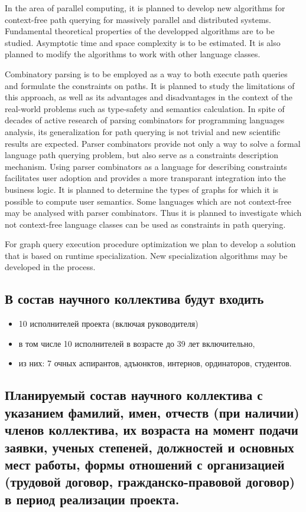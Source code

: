 \documentclass[12pt]{article}  %
\theoremstyle{remark}
\begin{document}
In the area of parallel computing, it is planned to develop new algorithms for context-free path querying for massively parallel and distributed systems.
Fundamental theoretical properties of the developped algorithms are to be studied.
Asymptotic time and space complexity is to be estimated.
It is also planned to modify the algorithms to work with other language classes.

Combinatory parsing is to be employed as a way to both execute path queries and formulate the constraints on paths.
It is planned to study the limitations of this approach, as well as its advantages and disadvantages in the context of the real-world problems such as type-safety and semantics calculation.
In spite of decades of active research of parsing combinators for programming languages analysis, its generalization for path querying is not trivial and new scientific results are expected.
Parser combinators provide not only a way to solve a formal language path querying problem, but also serve as a constraints description mechanism.
Using parser combinators as a language for describing constraints facilitates user adoption and provides a more transparant integration into the business logic.
It is planned to determine the types of graphs for which it is possible to compute user semantics.
Some languages which are not context-free may be analysed with parser combinators.
Thus it is planned to investigate which not context-free language classes can be used as constraints in path querying.

For graph query execution procedure optimization we plan to develop a solution that is based on runtime specialization. New specialization algorithms may be developed in the process.

\subsection{В состав научного коллектива будут входить}
%
\begin{itemize}
\item 10 исполнителей проекта (включая руководителя)
\item в том числе 10  исполнителей в возрасте до 39 лет включительно,
\item из них: 7 очных аспирантов, адъюнктов, интернов, ординаторов, студентов.
\end{itemize}

\subsection{Планируемый состав научного коллектива с указанием фамилий, имен, отчеств (при наличии) членов коллектива, их возраста на момент подачи заявки, ученых степеней, должностей и основных мест работы, формы отношений с организацией (трудовой договор, гражданско-правовой договор) в период реализации проекта.}
\end{document}

